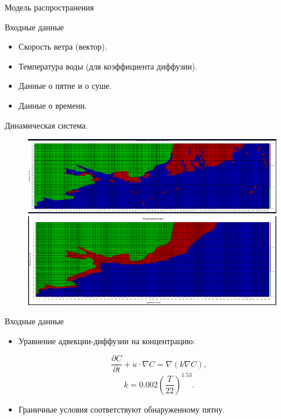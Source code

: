 \documentclass{beamer}
\begin{document}
\begin{section}{Модель распространения}
\begin{frame}{Входные данные}
\begin{itemize}
\item Скорость ветра (вектор).
\item Температура воды (для коэффициента диффузии).
\item Данные о пятне и о суше.
\item Данные о времени.
\end{itemize}
Динамическая система.

\begin{figure}
	\centering
	\begin{minipage}{0.5\textwidth}
		\includegraphics[scale=0.2]{photo_before.png}
	\end{minipage}%
	\begin{minipage}{0.5\textwidth}
		\includegraphics[scale=0.2]{photo_after.png}
	\end{minipage}
\end{figure}

\end{frame}		
\begin{frame}{Входные данные}
\begin{itemize}
	\item Уравнение адвекции-диффузии на концентрацию:
	
	$$\frac{\partial C}{\partial t} + u\cdot\nabla C = \nabla (k\nabla C),$$
	$$k = 0.002\left(\frac{T}{22}\right)^{1.53}.$$
	
	\item Граничные условия соответствуют обнаруженному пятну.
	

\end{itemize}
\end{frame}
\end{section}
\end{document}
